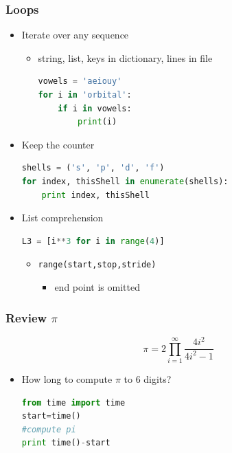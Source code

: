 \documentclass[xcolor=table,10pt,final]{beamer}
\begin{document}
\begin{frame}[fragile]
  \frametitle{Loops}
  \begin{itemize}
    \item Iterate over any sequence
      \begin{itemize}
        \item string, list, keys in dictionary, lines in file\\
  \begin{lstlisting}[language=python]
vowels = 'aeiouy'
for i in 'orbital':
    if i in vowels:
        print(i)
\end{lstlisting}
\end{itemize}
  \item Keep the counter\\
\begin{lstlisting}[language=python]
shells = ('s', 'p', 'd', 'f')
for index, thisShell in enumerate(shells):
    print index, thisShell
    \end{lstlisting}
  \item List comprehension\\
\begin{lstlisting}[language=python]
L3 = [i**3 for i in range(4)]
\end{lstlisting}
\begin{itemize}
  \item {\tt range(start,stop,stride)}
    \begin{itemize}
      \item end point is omitted
    \end{itemize}
\end{itemize}
\end{itemize}
\end{frame}

\begin{frame}[fragile]
  \frametitle{Review $\pi$}
  \begin{equation*}
    \pi = 2\prod^{\infty}_{i=1}\frac{4i^2}{4i^2-1}
  \end{equation*}
  \begin{itemize}
    \item<2-> How long to compute $\pi$ to 6 digits?\\
      \begin{lstlisting}[language=python]
from time import time
start=time()
#compute pi
print time()-start
      \end{lstlisting}
  \end{itemize}
\end{frame}
\end{document}
